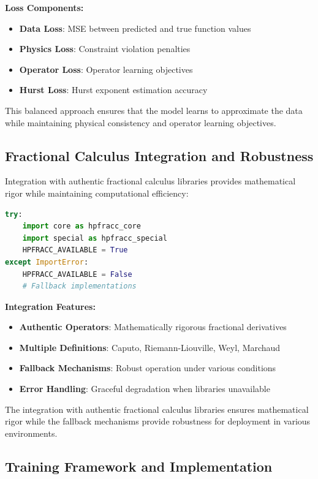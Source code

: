 \textbf{Loss Components:}
\begin{itemize}
    \item \textbf{Data Loss}: MSE between predicted and true function values
    \item \textbf{Physics Loss}: Constraint violation penalties
    \item \textbf{Operator Loss}: Operator learning objectives
    \item \textbf{Hurst Loss}: Hurst exponent estimation accuracy
\end{itemize}

This balanced approach ensures that the model learns to approximate the data while maintaining physical consistency and operator learning objectives.

\subsection{Fractional Calculus Integration and Robustness}

Integration with authentic fractional calculus libraries provides mathematical rigor while maintaining computational efficiency:

\begin{lstlisting}[language=Python, caption=Fractional Operator Integration]
try:
    import core as hpfracc_core
    import special as hpfracc_special
    HPFRACC_AVAILABLE = True
except ImportError:
    HPFRACC_AVAILABLE = False
    # Fallback implementations
\end{lstlisting}

\textbf{Integration Features:}
\begin{itemize}
    \item \textbf{Authentic Operators}: Mathematically rigorous fractional derivatives
    \item \textbf{Multiple Definitions}: Caputo, Riemann-Liouville, Weyl, Marchaud
    \item \textbf{Fallback Mechanisms}: Robust operation under various conditions
    \item \textbf{Error Handling}: Graceful degradation when libraries unavailable
\end{itemize}

The integration with authentic fractional calculus libraries ensures mathematical rigor while the fallback mechanisms provide robustness for deployment in various environments.

\subsection{Training Framework and Implementation}

